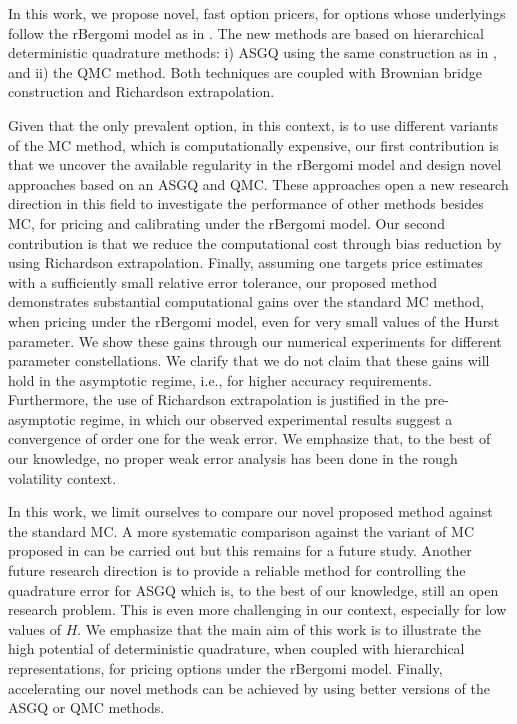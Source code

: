In this work,  we propose  novel, fast option pricers,  for options whose underlyings  follow the rBergomi model as in \cite{bayer2016pricing}.  The new methods  are based on hierarchical deterministic quadrature methods:  i) ASGQ using the same construction as in \cite{haji2016multi}, and ii) the QMC method. Both techniques are coupled with Brownian bridge construction and Richardson extrapolation.

Given that the only prevalent option, in this context, is to use different variants of the MC method, which is computationally expensive, our first contribution  is that we uncover the available regularity in the rBergomi model and  design novel  approaches based on an ASGQ and QMC. These approaches  open a new research direction in this field to investigate the performance of other methods besides MC, for pricing and calibrating under the rBergomi model. Our second contribution is that we reduce the computational cost  through bias reduction by using Richardson extrapolation. Finally, assuming one targets price estimates with a sufficiently small relative error tolerance, our proposed method demonstrates substantial computational gains  over the standard MC method, when pricing under the rBergomi model, even for very small values of the Hurst parameter. We show  these gains through our numerical experiments for  different parameter constellations.  We clarify that we do not claim that these gains will hold in the asymptotic regime, i.e.,  for higher accuracy requirements. Furthermore, the use of Richardson extrapolation is justified in the pre-asymptotic regime, in which our observed experimental results suggest a convergence of order one for the weak error. We emphasize that, to the best of our knowledge, no proper weak error analysis has been done in the rough volatility context. 

In this work, we limit ourselves to compare our novel proposed method against the standard MC. A more systematic comparison against the variant of MC proposed in \cite{mccrickerd2018turbocharging}  can be carried out but this remains for a future study. Another future research direction is to provide a reliable method for controlling the quadrature error for ASGQ which is,  to the best of our knowledge,  still  an open research problem. This is even more challenging in our context, especially for low values of $H$. We emphasize that the main aim of this work is to illustrate the high potential of deterministic quadrature, when coupled with hierarchical representations, for pricing options under the rBergomi model.   Finally, accelerating  our novel  methods can be achieved  by using better versions of the ASGQ or QMC methods.
